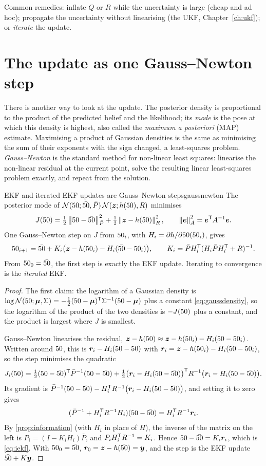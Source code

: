 Common remedies: inflate $Q$ or $R$ while the uncertainty is large (cheap
and ad hoc); propagate the uncertainty without linearising (the UKF,
Chapter~\ref{ch:ukf}); or \emph{iterate} the update.

\section{The update as one Gauss--Newton step}

There is another way to look at the update. The posterior density is
proportional to the product of the predicted belief and the likelihood; its \emph{mode} is the
pose at which this density is highest, also called the \emph{maximum a
posteriori} (MAP) estimate. Maximising a product of Gaussian densities is the same
as minimising the sum of their exponents with the sign changed, a
least-squares problem.
\emph{Gauss--Newton} is the standard method for non-linear least squares:
linearise the non-linear residual at the current point, solve the
resulting linear least-squares problem exactly, and repeat from the
solution.

\begin{proposition}{EKF and iterated EKF updates are Gauss--Newton steps}{gaussnewton}
The posterior mode of $\mathcal{N}(50;\bar{50},\bar P)\,\mathcal{N}(\bm{z};h(50),R)$
minimises
\[
  J(50)=\tfrac12\left\lVert 50-\bar{50}\right\rVert_{\bar P}^2+\tfrac12\left\lVert \bm{z}-h(50)\right\rVert_R^2,
  \qquad\left\lVert \bm{e}\right\rVert_A^2=\bm{e}^{\mathsf{T}} A^{-1}\bm{e}.
\]
One Gauss--Newton step on $J$ from $50_i$, with $H_i=\partial h/\partial
50(50_i)$, gives
\begin{equation}\label{eq:iekf}
  50_{i+1}=\bar{50}+K_i\bigl(\bm{z}-h(50_i)-H_i(\bar{50}-50_i)\bigr),\qquad
  K_i=\bar PH_i^{\mathsf{T}}(H_i\bar PH_i^{\mathsf{T}}+R)^{-1}.
\end{equation}
From $50_0=\bar{50}$, the first step is exactly the EKF update. Iterating to
convergence is the \emph{iterated} EKF.
\end{proposition}

\begin{proof}
The first claim: the logarithm of a Gaussian density is
$\log\mathcal{N}(50;\bm{\mu},\Sigma)=-\tfrac12(50-\bm{\mu})^{\mathsf{T}}\Sigma^{-1}(50-\bm{\mu})$
plus a constant \eqref{eq:gaussdensity}, so the logarithm of the product
of the two densities is $-J(50)$ plus a constant, and the product is
largest where $J$ is smallest.

Gauss--Newton linearises the residual,
$\bm{z}-h(50)\approx\bm{z}-h(50_i)-H_i(50-50_i)$. Written around $\bar{50}$, this is
$\bm{r}_i-H_i(50-\bar{50})$ with $\bm{r}_i=\bm{z}-h(50_i)-H_i(\bar{50}-50_i)$, so
the step minimises the quadratic
\[
  J_i(50)=\tfrac12(50-\bar{50})^{\mathsf{T}}\bar P^{-1}(50-\bar{50})
  +\tfrac12\bigl(\bm{r}_i-H_i(50-\bar{50})\bigr)^{\mathsf{T}} R^{-1}
  \bigl(\bm{r}_i-H_i(50-\bar{50})\bigr).
\]
Its gradient is
$\bar P^{-1}(50-\bar{50})-H_i^{\mathsf{T}} R^{-1}\bigl(\bm{r}_i-H_i(50-\bar{50})\bigr)$, and
setting it to zero gives
\[
  (\bar P^{-1}+H_i^{\mathsf{T}} R^{-1}H_i)(50-\bar{50})=H_i^{\mathsf{T}} R^{-1}\bm{r}_i .
\]
By \cref{prop:information} (with $H_i$ in place of $H$), the inverse of
the matrix on the left is $P_i=(I-K_iH_i)\bar P$, and
$P_iH_i^{\mathsf{T}} R^{-1}=K_i$. Hence $50-\bar{50}=K_i\bm{r}_i$, which is
\eqref{eq:iekf}. With $50_0=\bar{50}$, $\bm{r}_0=\bm{z}-h(\bar{50})=\bm{y}$, and the step is
the EKF update $\bar{50}+K\bm{y}$.
\end{proof}

